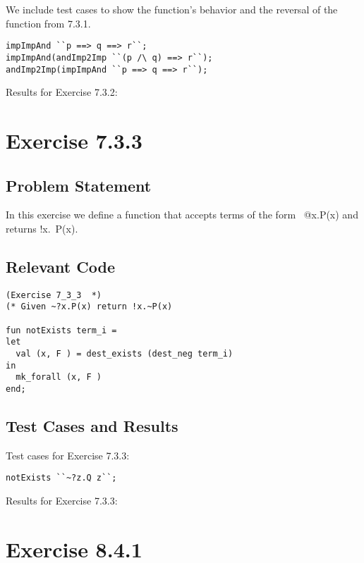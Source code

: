 \documentclass[letterpaper]{report}
\begin{document}
We include test cases to show the function's behavior and the reversal of the function from 7.3.1.

\begin{lstlisting}
impImpAnd ``p ==> q ==> r``;
impImpAnd(andImp2Imp ``(p /\ q) ==> r``);
andImp2Imp(impImpAnd ``p ==> q ==> r``);
\end{lstlisting}

Results for Exercise 7.3.2:





\newpage


\chapter{Exercise 7.3.3}
\label{sec:ex-7-3-3}

\section{Problem Statement}
In this exercise we define a function that accepts terms of the form ~@x.P(x) and returns !x.~P(x).  

\section{Relevant Code}

\begin{lstlisting}
(Exercise 7_3_3  *)
(* Given ~?x.P(x) return !x.~P(x)

fun notExists term_i =
let
  val (x, F ) = dest_exists (dest_neg term_i)
in
  mk_forall (x, F )
end;
\end{lstlisting}

\section{Test Cases and Results}

Test cases for Exercise 7.3.3:
\begin{lstlisting}
notExists ``~?z.Q z``;
\end{lstlisting}

Results for Exercise 7.3.3:




\newpage

\chapter{Exercise 8.4.1}
\label{sec:ex-8-4-1}
\end{document}
